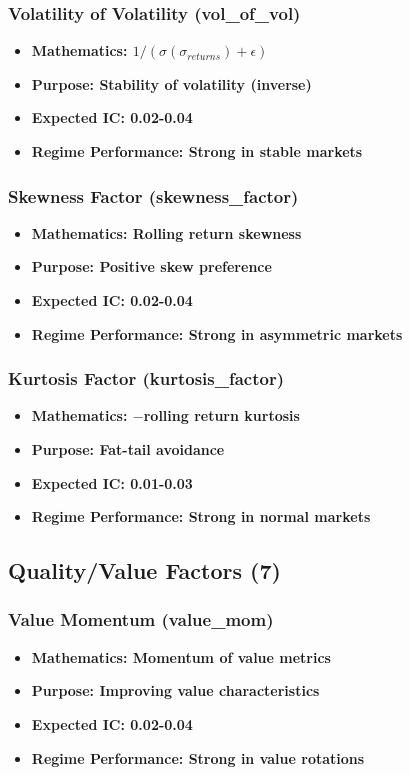 \documentclass[11pt,letterpaper,openany]{book}
\begin{document}
\subsubsection{Volatility of Volatility (vol\_of\_vol)}
\begin{itemize}
    \item \textbf{Mathematics: $1 / (\sigma(\sigma_{returns}) + \epsilon)$}
    \item \textbf{Purpose: Stability of volatility (inverse)}
    \item \textbf{Expected IC: 0.02-0.04}
    \item \textbf{Regime Performance: Strong in stable markets}
\end{itemize}

\subsubsection{Skewness Factor (skewness\_factor)}
\begin{itemize}
    \item \textbf{Mathematics: Rolling return skewness}
    \item \textbf{Purpose: Positive skew preference}
    \item \textbf{Expected IC: 0.02-0.04}
    \item \textbf{Regime Performance: Strong in asymmetric markets}
\end{itemize}

\subsubsection{Kurtosis Factor (kurtosis\_factor)}
\begin{itemize}
    \item \textbf{Mathematics: $-$rolling return kurtosis}
    \item \textbf{Purpose: Fat-tail avoidance}
    \item \textbf{Expected IC: 0.01-0.03}
    \item \textbf{Regime Performance: Strong in normal markets}
\end{itemize}

\subsection{Quality/Value Factors (7)}

\subsubsection{Value Momentum (value\_mom)}
\begin{itemize}
    \item \textbf{Mathematics: Momentum of value metrics}
    \item \textbf{Purpose: Improving value characteristics}
    \item \textbf{Expected IC: 0.02-0.04}
    \item \textbf{Regime Performance: Strong in value rotations}
\end{itemize}
\end{document}
